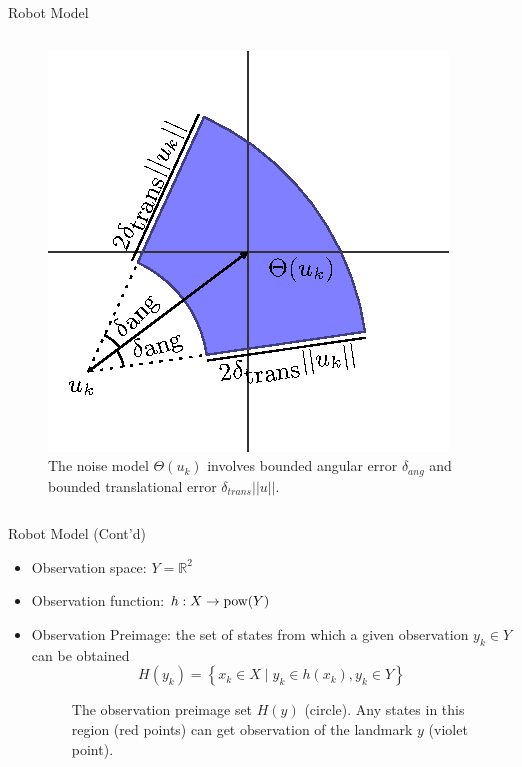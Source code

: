 \documentclass[10pt]{beamer}
\begin{document}
\begin{frame}{Robot Model}
\begin{itemize}
\begin{columns}
\begin{column}{0.5\textwidth}
\begin{figure}
        \includegraphics[scale=0.55]{figs/noisemodel}
        \caption{\scriptsize{The noise model $\Theta(u_k)$ involves bounded
            angular error $\delta_{ang}$ and bounded translational error
            $\delta_{trans}||u||$.}}
        \label{fig:noiseModel}
      \end{figure}
    \end{column}
  \end{columns}
\end{itemize}
\end{frame}

\begin{frame}{Robot Model (Cont'd)}
  \begin{itemize}
  \item Observation space: $Y = \mathbb{R}^2$
  \item Observation function: $h : X \to \operatorname{pow}(Y) $
  \item Observation Preimage: the set of states from which a given observation
    $y_k \in Y$ can be obtained
    \begin{equation}
      H(y_k) = \left\{ x_k \in X \mid y_k \in h(x_k), y_k \in Y \right\}
    \end{equation}
    
    \begin{figure}
      \centering
      \caption{\scriptsize{The observation preimage set $H(y)$ (circle). Any states
          in this region (red points) can get observation of the landmark $y$
          (violet point).}}
    \end{figure}
  \end{itemize}
\end{frame}
\end{document}
